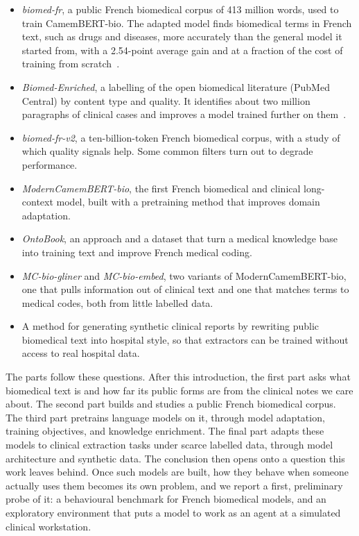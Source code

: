 \begin{itemize}
  \item \emph{biomed-fr}, a public French biomedical corpus of 413 million words, used to train CamemBERT-bio. The adapted model finds biomedical terms in French text, such as drugs and diseases, more accurately than the general model it started from, with a 2.54-point average gain and at a fraction of the cost of training from scratch~\citep{touchent2023camembertbio}.
  \item \emph{Biomed-Enriched}, a labelling of the open biomedical literature (PubMed Central) by content type and quality. It identifies about two million paragraphs of clinical cases and improves a model trained further on them~\citep{touchent-etal-2026-biomed}.
  \item \emph{biomed-fr-v2}, a ten-billion-token French biomedical corpus, with a study of which quality signals help. Some common filters turn out to degrade performance.
  \item \emph{ModernCamemBERT-bio}, the first French biomedical and clinical long-context model, built with a pretraining method that improves domain adaptation.
  \item \emph{OntoBook}, an approach and a dataset that turn a medical knowledge base into training text and improve French medical coding.
  \item \emph{MC-bio-gliner} and \emph{MC-bio-embed}, two variants of ModernCamemBERT-bio, one that pulls information out of clinical text and one that matches terms to medical codes, both from little labelled data.
  \item A method for generating synthetic clinical reports by rewriting public biomedical text into hospital style, so that extractors can be trained without access to real hospital data.
\end{itemize}

\begin{reviewrewrite}
The parts follow these questions. After this introduction, the first part asks what biomedical text is and how far its public forms are from the clinical notes we care about. The second part builds and studies a public French biomedical corpus. The third part pretrains language models on it, through model adaptation, training objectives, and knowledge enrichment. The final part adapts these models to clinical extraction tasks under scarce labelled data, through model architecture and synthetic data. The conclusion then opens onto a question this work leaves behind. Once such models are built, how they behave when someone actually uses them becomes its own problem, and we report a first, preliminary probe of it: a behavioural benchmark for French biomedical models, and an exploratory environment that puts a model to work as an agent at a simulated clinical workstation.
\end{reviewrewrite}
